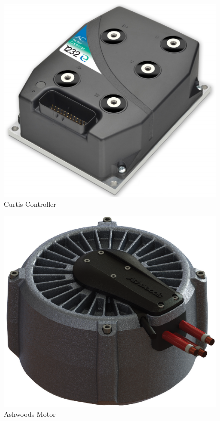 \begin{figure}[H]
	\begin{center}
		\includegraphics[scale=0.5]{figures/allgemein/Curtis_Controller.png}
		\caption{Curtis Controller}
	\end{center}
\end{figure}


\begin{figure}[H]
	\begin{center}
		\includegraphics[scale=0.5]{figures/allgemein/Ashwoods_Motor.png}
		\caption{Ashwoods Motor}

	\end{center}
\end{figure}

